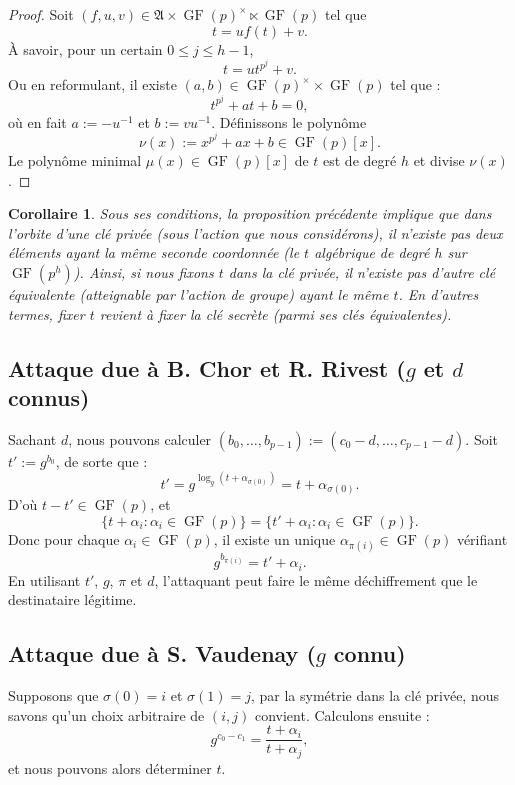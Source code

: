 \documentclass[a4paper, titlepage]{article}
\newtheorem{coro}[theo]{Corollaire}
\theoremstyle{definition}
\theoremstyle{remark}
\def\gf{\operatorname{GF}}
\begin{document}
\begin{proof}
Soit $(f,u,v) \in {\mathfrak{A} \times \gf(p)^\times \ltimes \gf(p)}$ tel que $$t = uf(t) +v.$$
À savoir, pour un certain $0 \leqslant j \leqslant h-1$,
$$t = ut^{p^j} +v.$$
Ou en reformulant, il existe $(a,b) \in \gf(p)^{\times} \times \gf(p)$ tel que : $$t^{p^j} +at +b = 0,$$
où en fait $a := -u^{-1}$ et $b := vu^{-1}$.
Définissons le polynôme $$\nu(x) := x^{p^j} +ax +b \in \gf(p)[x].$$
Le polynôme minimal $\mu(x) \in \gf(p)[x]$ de $t$ est de degré $h$ et divise $\nu(x)$.
\end{proof}

\begin{coro}
Sous ses conditions, la proposition précédente implique que dans l'orbite d'une clé privée (sous l'action que nous considérons), il n'existe pas deux éléments ayant la même seconde coordonnée (le $t$ algébrique de degré $h$ sur $\gf(p^h)$). Ainsi, si nous fixons $t$ dans la clé privée, il n'existe pas d'autre clé équivalente (atteignable par l'action de groupe) ayant le même $t$. En d'autres termes, fixer $t$ revient à fixer la clé secrète (parmi ses clés équivalentes).
\end{coro}

\subsection{Attaque due à B. Chor et R. Rivest ($g$ et $d$ connus)}
Sachant $d$, nous pouvons calculer 
$( b_0, \dots, b_{p-1}) := (c_0 -d, \dots, c_{p-1}-d )$.
Soit $t' := g^{b_0}$, de sorte que :
$$t' = g^{\log_g(t+\alpha_{\sigma(0)})} = t + \alpha_{\sigma(0)}.$$
D'où $t-t' \in \gf(p)$, et 
$$\{t + \alpha_i : \alpha_i \in \gf(p)\} = \{t' + \alpha_i : \alpha_i \in \gf(p)\}.$$
Donc pour chaque $\alpha_i \in \gf(p)$, il existe un unique $\alpha_{\pi(i)} \in \gf(p)$ vérifiant 
$$g^{b_{\pi(i)}} =  t' +\alpha_{i}.$$
En utilisant $t'$, $g$, $\pi$ et $d$, l'attaquant peut faire le même déchiffrement que le destinataire légitime.

\subsection{Attaque due à S. Vaudenay ($g$ connu)}

Supposons que $\sigma(0) = i$ et $\sigma(1) = j$, par la symétrie dans la clé privée, nous savons qu'un choix arbitraire de $(i,j)$ convient. Calculons ensuite :
$$g^{c_0-c_1} = \frac{t+\alpha_i}{t+\alpha_j},$$
et nous pouvons alors déterminer $t$.
\end{document}

